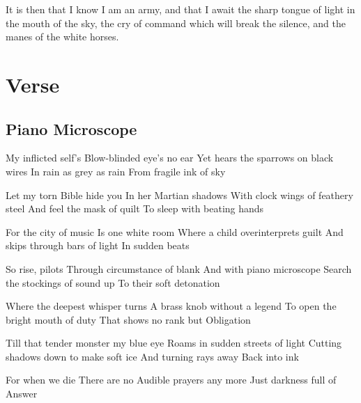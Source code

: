 \documentclass[english,11pt,letterpaper,onecolumn]{scrbook}
\begin{document}
	It is then that I know I am an army, and that I await the sharp tongue of light in the mouth of the sky, the cry of command which will break the silence, and the manes of the white horses.


\chapter{Verse}

\newpage
\section{Piano Microscope}

\begin{poem}
\begin{stanza}
My inflicted self's\verseline
Blow-blinded eye's no ear\verseline
Yet hears the sparrows on black wires\verseline
In rain as grey as rain\verseline
From fragile ink of sky
\end{stanza}

\begin{stanza} 
Let my torn Bible hide you\verseline
In her Martian shadows\verseline
With clock wings of feathery steel\verseline
And feel the mask of quilt\verseline
To sleep with beating hands
\end{stanza}

\begin{stanza}
For the city of music\verseline
Is one white room\verseline
Where a child overinterprets guilt\verseline
And skips through bars of light\verseline
In sudden beats
\end{stanza}

\begin{stanza}
So rise, pilots\verseline
Through circumstance of blank\verseline
And with piano microscope\verseline
Search the stockings of sound up\verseline
To their soft detonation
\end{stanza}

\begin{stanza}
Where the deepest whisper turns\verseline
A brass knob without a legend\verseline
To open the bright mouth of duty\verseline
That shows no rank but \verseline
Obligation
\end{stanza}

\begin{stanza}
Till that tender monster my blue eye\verseline 
Roams in sudden streets of light\verseline
Cutting shadows down to make soft ice\verseline
And turning rays away\verseline
Back into ink
\end{stanza}

\begin{stanza}
For when we die\verseline
There are no \verseline
Audible prayers any more\verseline
Just darkness full of \verseline
Answer
\end{stanza}
\end{poem}
\end{document}
